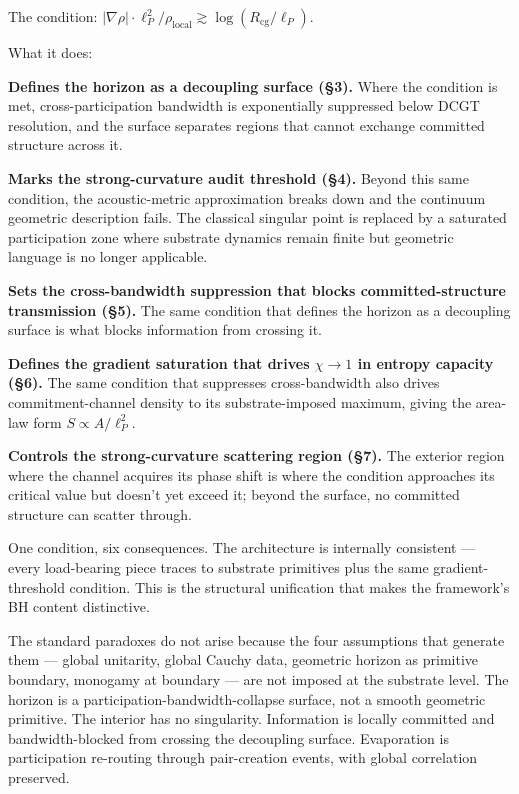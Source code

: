 \documentclass[11pt,a4paper]{article}
\begin{document}
The condition: $|\nabla\rho|\cdot\ell_P^2/\rho_{\mathrm{local}} \gtrsim \log(R_{\mathrm{cg}}/\ell_P)$.

What it does:

\textbf{Defines the horizon as a decoupling surface (\S3).} Where the condition is met, cross-participation bandwidth is exponentially suppressed below DCGT resolution, and the surface separates regions that cannot exchange committed structure across it.

\textbf{Marks the strong-curvature audit threshold (\S4).} Beyond this same condition, the acoustic-metric approximation breaks down and the continuum geometric description fails. The classical singular point is replaced by a saturated participation zone where substrate dynamics remain finite but geometric language is no longer applicable.

\textbf{Sets the cross-bandwidth suppression that blocks committed-structure transmission (\S5).} The same condition that defines the horizon as a decoupling surface is what blocks information from crossing it.

\textbf{Defines the gradient saturation that drives $\chi \to 1$ in entropy capacity (\S6).} The same condition that suppresses cross-bandwidth also drives commitment-channel density to its substrate-imposed maximum, giving the area-law form $S \propto A/\ell_P^2$.

\textbf{Controls the strong-curvature scattering region (\S7).} The exterior region where the channel acquires its phase shift is where the condition approaches its critical value but doesn't yet exceed it; beyond the surface, no committed structure can scatter through.

One condition, six consequences. The architecture is internally consistent --- every load-bearing piece traces to substrate primitives plus the same gradient-threshold condition. This is the structural unification that makes the framework's BH content distinctive.

The standard paradoxes do not arise because the four assumptions that generate them --- global unitarity, global Cauchy data, geometric horizon as primitive boundary, monogamy at boundary --- are not imposed at the substrate level. The horizon is a participation-bandwidth-collapse surface, not a smooth geometric primitive. The interior has no singularity. Information is locally committed and bandwidth-blocked from crossing the decoupling surface. Evaporation is participation re-routing through pair-creation events, with global correlation preserved.
\end{document}
